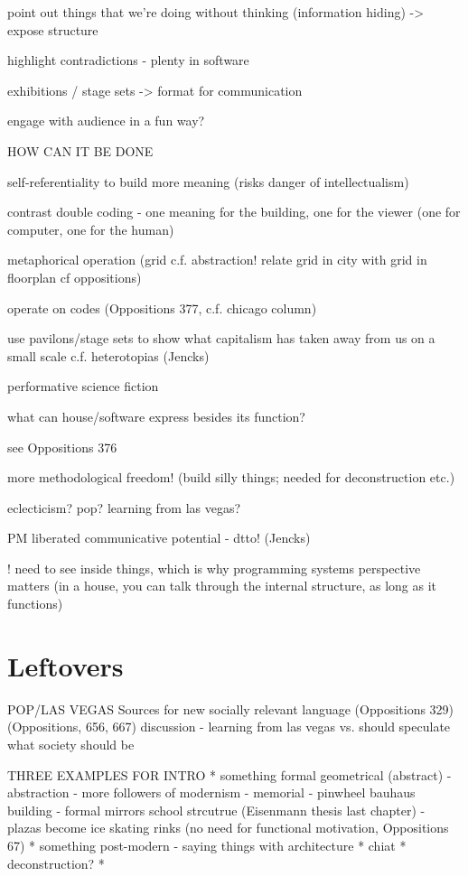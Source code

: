 point out things that we're doing without thinking (information hiding)
-> expose structure

highlight contradictions - plenty in software

exhibitions / stage sets
-> format for communication

engage with audience in a fun way?




\newpage

HOW CAN IT BE DONE

self-referentiality to build more meaning
  (risks danger of intellectualism)

contrast double coding - one meaning for the building, one for the viewer
(one for computer, one for the human)

metaphorical operation (grid c.f. abstraction!
  relate grid in city with grid in floorplan cf oppositions)

operate on codes (Oppositions 377, c.f. chicago column)

use pavilons/stage sets to show what capitalism has
taken away from us on a small scale
c.f. heterotopias (Jencks)

performative science fiction

what can house/software express besides its function?

see Oppositions 376

more methodological freedom!
(build silly things; needed for deconstruction etc.)

eclecticism? pop? learning from las vegas?

PM liberated communicative potential - dtto! (Jencks)

! need to see inside things, which is why programming systems perspective matters
(in a house, you can talk through the internal structure, as long as it functions)

\section{Leftovers}

POP/LAS VEGAS
Sources for new socially relevant language (Oppositions 329)
(Oppositions, 656,  667)
discussion - learning from las vegas
vs. should speculate what society should be


THREE EXAMPLES FOR INTRO
* something formal geometrical (abstract)
  - abstraction
  - more followers of modernism
  - memorial
  - pinwheel bauhaus building - formal mirrors school strcutrue (Eisenmann thesis last chapter)
  - plazas become ice skating rinks (no need for functional motivation, Oppositions 67)
* something post-modern - saying things with architecture
* chiat
* deconstruction?
*


